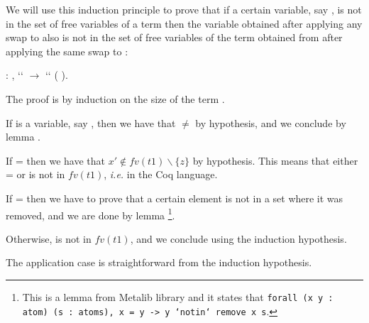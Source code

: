 We will use this induction principle to prove that if a certain variable, say , is not in the set of free variables of a term  then the variable obtained after applying any swap to  also is not in the set of free variables of the term obtained from  after applying the same swap to : 
\begin{coqdoccode}
\coqdocemptyline
\coqdocnoindent
{}  : \coqdockw{\ensuremath{\forall}}    ,  ``   \ensuremath{\rightarrow}      ``  (   ).\coqdoceol
\end{coqdoccode}
 The proof is by induction on the size of the term .
\begin{coqdoccode}
\end{coqdoccode}
If  is a variable, say , then we have that  \ensuremath{\not=}  by hypothesis, and we conclude by lemma .
\begin{coqdoccode}
\end{coqdoccode}
If  =    then we have that $x' \notin fv(t1) \backslash \{z\}$ by hypothesis. This means that either  =  or  is not in $fv(t1)$, {\it i.e.}   in the Coq language.
\begin{coqdoccode}
\end{coqdoccode}
If  =  then we have to prove that a certain element is not in a set where it was removed, and we are done by lemma \footnote{This is a lemma from Metalib library and it states that {\tt forall (x y : atom) (s : atoms), x = y -> y `notin` remove x s}.}. 
\begin{coqdoccode}
\end{coqdoccode}
Otherwise,  is not in $fv(t1)$, and we conclude using the induction hypothesis.
\begin{coqdoccode}
\end{coqdoccode}
The application case is straightforward from the induction hypothesis.
\begin{coqdoccode}
\end{coqdoccode}
